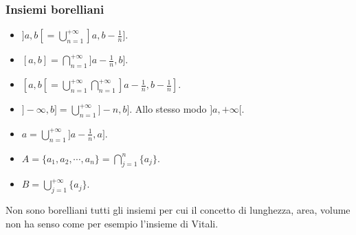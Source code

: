 \subsubsection{Insiemi borelliani}
\begin{itemize}
\item $]a,b[=\bigcup\limits_{n=1}^{+\infty}]a,b-\frac{1}{n}]$.
\item $[a,b]=\bigcap\limits_{n=1}^{+\infty}]a-\frac{1}{n},b]$.
\item $[a,b[=\bigcup\limits_{n=1}^{+\infty}\bigcap\limits_{n=1}^{+\infty}]a-\frac{1}{n},b-\frac{1}{n}]$. 
\item $]-\infty,b]=\bigcup\limits_{n=1}^{+\infty}]-n, b]$. Allo stesso modo $]a,+\infty[$.
\item $a=\bigcup\limits_{n=1}^{+\infty}]a-\frac{1}{n},a]$.
\item $A=\{a_1,a_2,\cdots, a_n\}=\bigcap\limits_{j=1}^n\{a_j\}$.
\item $B=\bigcup\limits_{j=1}^{+\infty}\{a_j\}$.
\end{itemize}
Non sono borelliani tutti gli insiemi per cui il concetto di lunghezza, area, volume non ha senso come per esempio l'insieme di Vitali.                                                                                                                                                                                                                                                                                                                                                                                                                                                                                                                                                                                                                                                                                                                                                                                                                                                                                                                                                                                                                                                                                                                                                                                                                                                                                                                                                                                                                                                                                                                                                                                                                                                                                                                                                                                                                                                                             
